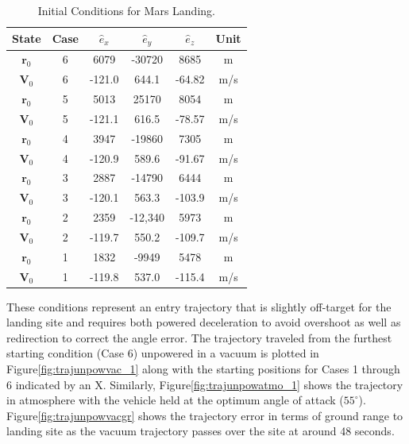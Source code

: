 \begin{table}[hbt]
	\centering
	\begin{minipage}{3.5in}
		\centering
		\caption{Initial Conditions for Mars Landing\label{tab:IC}.}
		\begin{tabular}{|c||c|c|c|c|c||}    \hline
			State &	Case & $\hat{e}_x$  &  $\hat{e}_y$ & $\hat{e}_z$ & Unit \\ \hline \hline
			$\bm{r}_0$ & 6 & 6079  & -30720 & 8685 & m \\ \hline
			$\bm{V}_0$ & 6 & -121.0  & 644.1 & -64.82 & m/s \\ \hline
			$\bm{r}_0$ & 5 & 5013  & 25170 & 8054 & m \\ \hline
			$\bm{V}_0$ & 5 & -121.1  & 616.5 & -78.57 & m/s \\ \hline
			$\bm{r}_0$ & 4 & 3947  & -19860 & 7305 & m\\ \hline
			$\bm{V}_0$ & 4 & -120.9  & 589.6 & -91.67 & m/s \\ \hline
			$\bm{r}_0$ & 3 & 2887  & -14790 & 6444 & m \\ \hline
			$\bm{V}_0$ & 3 & -120.1  & 563.3 & -103.9 & m/s \\ \hline
			$\bm{r}_0$ & 2 & 2359  & -12,340 & 5973 & m \\ \hline
			$\bm{V}_0$ & 2 & -119.7  & 550.2 & -109.7 & m/s \\ \hline
			$\bm{r}_0$ & 1 & 1832 & -9949 & 5478 & m \\ \hline
			$\bm{V}_0$ & 1 & -119.8 & 537.0 & -115.4 & m/s \\ \hline
		\end{tabular}
	\end{minipage}
\end{table}

These conditions represent an entry trajectory that is slightly off-target for the landing site and requires both powered deceleration to avoid overshoot as well as redirection to correct the angle error. The trajectory traveled from the furthest starting condition (Case 6) unpowered in a vacuum is plotted in Figure\:\ref{fig:trajunpowvac_1} along with the starting positions for Cases 1 through 6 indicated by an X. Similarly, Figure\:\ref{fig:trajunpowatmo_1} shows the trajectory in atmosphere with the vehicle held at the optimum angle of attack ($55^{\circ}$). Figure\:\ref{fig:trajunpowvacgr} shows the trajectory error in terms of ground range to landing site as the vacuum trajectory passes over the site at around 48 seconds.

